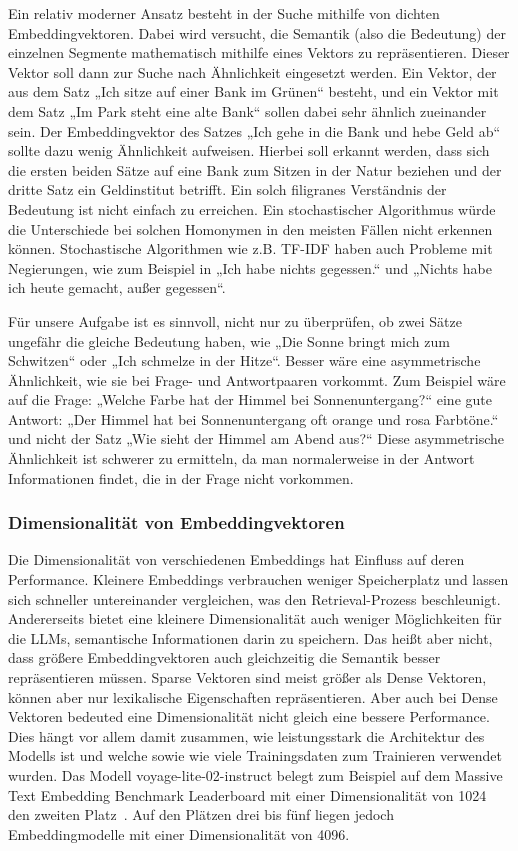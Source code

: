 Ein relativ moderner Ansatz besteht in der Suche mithilfe von dichten Embeddingvektoren.
Dabei wird versucht, die Semantik (also die Bedeutung) der einzelnen Segmente mathematisch mithilfe eines Vektors zu repräsentieren.
Dieser Vektor soll dann zur Suche nach Ähnlichkeit eingesetzt werden.
Ein Vektor, der aus dem Satz „Ich sitze auf einer Bank im Grünen“ besteht, und ein Vektor mit dem Satz „Im Park steht eine alte Bank“ sollen dabei sehr ähnlich zueinander sein.
Der Embeddingvektor des Satzes „Ich gehe in die Bank und hebe Geld ab“ sollte dazu wenig Ähnlichkeit aufweisen.
Hierbei soll erkannt werden, dass sich die ersten beiden Sätze auf eine Bank zum Sitzen in der Natur beziehen und der dritte Satz ein Geldinstitut betrifft.
Ein solch filigranes Verständnis der Bedeutung ist nicht einfach zu erreichen.
Ein stochastischer Algorithmus würde die Unterschiede bei solchen Homonymen in den meisten Fällen nicht erkennen können. 
Stochastische Algorithmen wie z.B. TF-IDF haben auch Probleme mit Negierungen, wie zum Beispiel in „Ich habe nichts gegessen.“ und „Nichts habe ich heute gemacht, außer gegessen“.

Für unsere Aufgabe ist es sinnvoll, nicht nur zu überprüfen, ob zwei Sätze ungefähr die gleiche Bedeutung haben, wie „Die Sonne bringt mich zum Schwitzen“ oder „Ich schmelze in der Hitze“.
Besser wäre eine asymmetrische Ähnlichkeit, wie sie bei Frage- und Antwortpaaren vorkommt.
Zum Beispiel wäre auf die Frage: „Welche Farbe hat der Himmel bei Sonnenuntergang?“ eine gute Antwort: „Der Himmel hat bei Sonnenuntergang oft orange und rosa Farbtöne.“ und nicht der Satz „Wie sieht der Himmel am Abend aus?“
Diese asymmetrische Ähnlichkeit ist schwerer zu ermitteln, da man normalerweise in der Antwort Informationen findet, die in der Frage nicht vorkommen.

\subsubsection{Dimensionalität von Embeddingvektoren}

Die Dimensionalität von verschiedenen Embeddings hat Einfluss auf deren Performance.
Kleinere Embeddings verbrauchen weniger Speicherplatz und lassen sich schneller untereinander vergleichen, was den Retrieval-Prozess beschleunigt.
Andererseits bietet eine kleinere Dimensionalität auch weniger Möglichkeiten für die LLMs, semantische Informationen darin zu speichern.
Das heißt aber nicht, dass größere Embeddingvektoren auch gleichzeitig die Semantik besser repräsentieren müssen.
Sparse Vektoren sind meist größer als Dense Vektoren, können aber nur lexikalische Eigenschaften repräsentieren.
Aber auch bei Dense Vektoren bedeuted eine Dimensionalität nicht gleich eine bessere Performance.
Dies hängt vor allem damit zusammen, wie leistungsstark die Architektur des Modells ist und welche sowie wie viele Trainingsdaten zum Trainieren verwendet wurden.
Das Modell voyage-lite-02-instruct belegt zum Beispiel auf dem Massive Text Embedding Benchmark Leaderboard mit einer Dimensionalität von 1024 den zweiten Platz~\cite{mteb}.
Auf den Plätzen drei bis fünf liegen jedoch Embeddingmodelle mit einer Dimensionalität von 4096.

